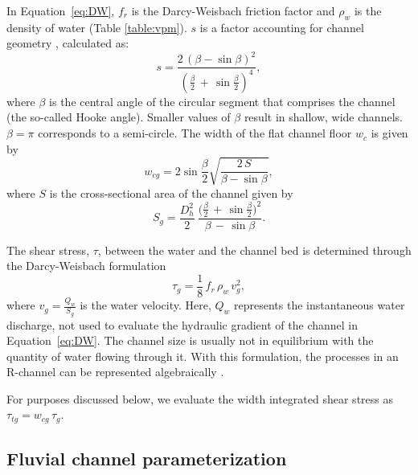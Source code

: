 \documentclass[11pt]{article}
\begin{document}
\begin{spacing}{1}
          In Equation~\ref{eq:DW}, $f_r$ is the Darcy-Weisbach friction factor and $\rho_w$ is the density of water (Table \ref{table:vpm}). $s$ is a factor accounting for channel geometry \citep{hooke1990}, calculated as:
          \begin{equation}
            \label{eq:Hf}
            s = \frac{2\,(\beta -\sin \beta)^2}{(\frac{\beta}{2}\,+\,\sin \frac{\beta}{2})^4},
          \end{equation}
          where $\beta$ is the central angle of the circular segment that comprises the channel (the so-called Hooke angle).
          Smaller values of $\beta$ result in shallow, wide channels. $\beta =\pi$ corresponds to a semi-circle.
          The width of the flat channel floor $w_c$ is given by
          \begin{equation}
            \label{eq:dh2wc}
            w_{cg} = 2  \sin \frac{\beta}{2} \sqrt{\frac{2\, S}{\beta -\sin \beta}},
          \end{equation}
          where $S$ is the cross-sectional area of the channel given by
          \begin{equation}
            \label{eq:dh2S}
            S_g =  \frac{D_h^2}{2}~ \frac{\Big(\frac{\beta}{2} \,+ \, \sin \frac{\beta}{2}\Big)^2  }{\beta\,-\,\sin \beta}.
          \end{equation}
          
          The shear stress, $\tau$, between the water and the channel bed is determined through the Darcy-Weisbach formulation
          \begin{equation}
            \label{eq:tau}
            \tau_g=\frac{1}{8}\,f_r\,\rho_w\,v_g^2,
          \end{equation}
          where $v_g = \frac{Q_w}{S_g}$ is the water velocity.
          Here, $Q_w$ represents the instantaneous water discharge, not used to evaluate the hydraulic gradient of the channel in Equation~\ref{eq:DW}.
          The channel size is usually not in equilibrium with the quantity of water flowing through it.
          With this formulation, the processes in an R-channel can be represented algebraically \citep{delaney2019}.
        
          For purposes discussed below, we evaluate the width integrated shear stress as $\tau_{tg}=w_{cg}\,\tau_g $.
        
          \subsection{Fluvial channel  parameterization}
          \label{sect:fluv}
          

\end{spacing}
\end{document}

